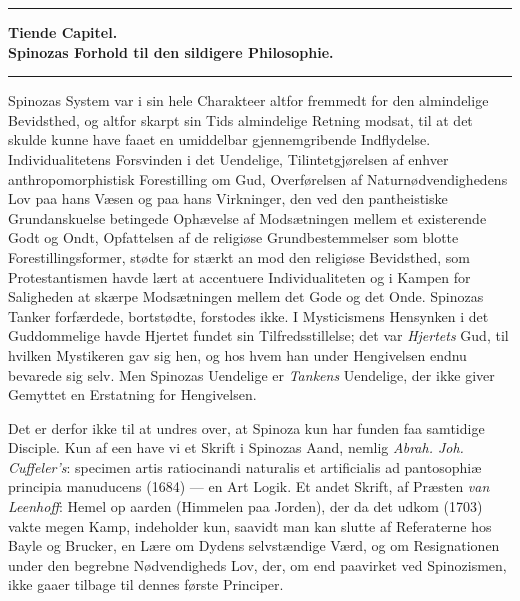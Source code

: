 \documentclass[12pt,a4paper]{book}
\newcommand{\opage}[1]{\marginnote{\footnotesize\textit{[#1]}}}
\begin{document}
\bigskip
\begin{center}\rule{2.5cm}{0.4pt}\end{center}   %
\bigskip

\begin{center}
{\large\textbf{Tiende Capitel.}}\\[4pt]
\textbf{Spinozas Forhold til den sildigere Philosophie.}\\[6pt]
\rule{2cm}{0.4pt}
\end{center}
\bigskip

Spinozas System var i sin hele Charakteer altfor fremmedt
for den almindelige Bevidsthed, og altfor skarpt sin Tids
\opage{182} almindelige Retning modsat, til at det skulde kunne have faaet
en umiddelbar gjennemgribende Indflydelse. Individualitetens
Forsvinden i det Uendelige, Tilintetgjørelsen af enhver anthropomorphistisk
Forestilling om Gud, Overførelsen af Naturnødvendighedens
Lov paa hans Væsen og paa hans Virkninger,
den ved den pantheistiske Grundanskuelse betingede Ophævelse
af Modsætningen mellem et existerende Godt og Ondt, Opfattelsen
af de religiøse Grundbestemmelser som blotte Forestillingsformer,
stødte for stærkt an mod den religiøse Bevidsthed,
som Protestantismen havde lært at accentuere Individualiteten
og i Kampen for Saligheden at skærpe Modsætningen
mellem det Gode og det Onde. Spinozas Tanker forfærdede,
bortstødte, forstodes ikke. I Mysticismens Hensynken i det
Guddommelige havde Hjertet fundet sin Tilfredsstillelse;
det var \emph{Hjertets} Gud, til hvilken Mystikeren gav sig hen,
og hos hvem han under Hengivelsen endnu bevarede sig
selv. Men Spinozas Uendelige er \emph{Tankens} Uendelige, der
ikke giver Gemyttet en Erstatning for Hengivelsen.

Det er derfor ikke til at undres over, at Spinoza kun
har funden faa samtidige Disciple. Kun af een have vi et
Skrift i Spinozas Aand, nemlig \emph{Abrah. Joh. Cuffeler's}:
specimen artis ratiocinandi naturalis et artificialis ad pantosophiæ
principia manuducens (1684) --- en Art Logik. Et
andet Skrift, af Præsten \emph{van Leenhoff}: Hemel op aarden
(Himmelen paa Jorden), der da det udkom (1703) vakte
megen Kamp, indeholder kun, saavidt man kan slutte af
Referaterne hos Bayle og Brucker, en Lære om Dydens
selvstændige Værd, og om Resignationen under den begrebne
Nødvendigheds Lov, der, om end paavirket ved Spinozismen,
ikke gaaer tilbage til dennes første Principer.
\end{document}
